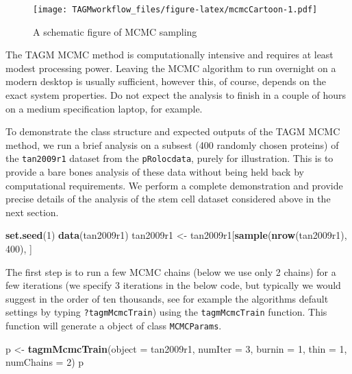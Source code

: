 \documentclass[]{article}
\newenvironment{Shaded}{\begin{snugshade}}{\end{snugshade}}
\newcommand{\KeywordTok}[1]{\textcolor[rgb]{0.13,0.29,0.53}{\textbf{{#1}}}}
\newcommand{\DataTypeTok}[1]{\textcolor[rgb]{0.13,0.29,0.53}{{#1}}}
\newcommand{\DecValTok}[1]{\textcolor[rgb]{0.00,0.00,0.81}{{#1}}}
\newcommand{\StringTok}[1]{\textcolor[rgb]{0.31,0.60,0.02}{{#1}}}
\newcommand{\NormalTok}[1]{{#1}}
\begin{document}
\begin{figure}[htbp]
\centering
\texttt{[image: TAGMworkflow\_files/figure-latex/mcmcCartoon-1.pdf]}
\caption{\label{fig:mcmcCartoon}A schematic figure of MCMC sampling}
\end{figure}

The TAGM MCMC method is computationally intensive and requires at least
modest processing power. Leaving the MCMC algorithm to run overnight on
a modern desktop is usually sufficient, however this, of course, depends
on the exact system properties. Do not expect the analysis to finish in
a couple of hours on a medium specification laptop, for example.

To demonstrate the class structure and expected outputs of the TAGM MCMC
method, we run a brief analysis on a subsest (400 randomly chosen
proteins) of the \texttt{tan2009r1} dataset from the
\texttt{pRolocdata}, purely for illustration. This is to provide a bare
bones analysis of these data without being held back by computational
requirements. We perform a complete demonstration and provide precise
details of the analysis of the stem cell dataset considered above in the
next section.

\begin{Shaded}
\begin{Highlighting}[]
\KeywordTok{set.seed}\NormalTok{(}\DecValTok{1}\NormalTok{)}
\KeywordTok{data}\NormalTok{(tan2009r1)}
\NormalTok{tan2009r1 <-}\StringTok{ }\NormalTok{tan2009r1[}\KeywordTok{sample}\NormalTok{(}\KeywordTok{nrow}\NormalTok{(tan2009r1), }\DecValTok{400}\NormalTok{), ]}
\end{Highlighting}
\end{Shaded}

The first step is to run a few MCMC chains (below we use only 2 chains)
for a few iterations (we specify 3 iterations in the below code, but
typically we would suggest in the order of ten thousands, see for
example the algorithms default settings by typing
\texttt{?tagmMcmcTrain}) using the \texttt{tagmMcmcTrain} function. This
function will generate a object of class \texttt{MCMCParams}.

\begin{Shaded}
\begin{Highlighting}[]
\NormalTok{p <-}\StringTok{ }\KeywordTok{tagmMcmcTrain}\NormalTok{(}\DataTypeTok{object =} \NormalTok{tan2009r1, }\DataTypeTok{numIter =} \DecValTok{3}\NormalTok{,}
                   \DataTypeTok{burnin =} \DecValTok{1}\NormalTok{, }\DataTypeTok{thin =} \DecValTok{1}\NormalTok{, }\DataTypeTok{numChains =} \DecValTok{2}\NormalTok{)}
\NormalTok{p}
\end{Highlighting}
\end{Shaded}
\end{document}
